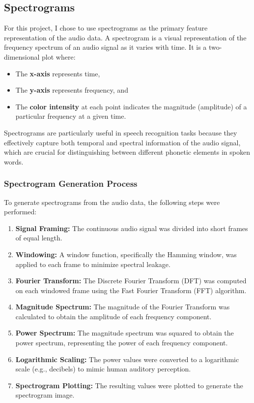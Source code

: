 \documentclass[12pt]{article}
\begin{document}
\subsection{Spectrograms}

For this project, I chose to use spectrograms as the primary feature representation of the audio data. A spectrogram is a visual representation of the frequency spectrum of an audio signal as it varies with time. It is a two-dimensional plot where:

\begin{itemize}
\item The \textbf{x-axis} represents time,
\item The \textbf{y-axis} represents frequency, and
\item The \textbf{color intensity} at each point indicates the magnitude (amplitude) of a particular frequency at a given time.
\end{itemize}

Spectrograms are particularly useful in speech recognition tasks because they effectively capture both temporal and spectral information of the audio signal, which are crucial for distinguishing between different phonetic elements in spoken words.

\subsubsection{Spectrogram Generation Process}

To generate spectrograms from the audio data, the following steps were performed:

\begin{enumerate}
\item \textbf{Signal Framing:} The continuous audio signal was divided into short frames of equal length.
\item \textbf{Windowing:} A window function, specifically the Hamming window, was applied to each frame to minimize spectral leakage.
\item \textbf{Fourier Transform:} The Discrete Fourier Transform (DFT) was computed on each windowed frame using the Fast Fourier Transform (FFT) algorithm.
\item \textbf{Magnitude Spectrum:} The magnitude of the Fourier Transform was calculated to obtain the amplitude of each frequency component.
\item \textbf{Power Spectrum:} The magnitude spectrum was squared to obtain the power spectrum, representing the power of each frequency component.
\item \textbf{Logarithmic Scaling:} The power values were converted to a logarithmic scale (e.g., decibels) to mimic human auditory perception.
\item \textbf{Spectrogram Plotting:} The resulting values were plotted to generate the spectrogram image.
\end{enumerate}
\end{document}
